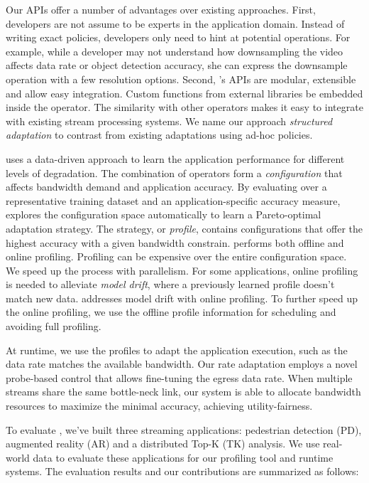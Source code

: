Our APIs offer a number of advantages over existing approaches. First,
developers are not assume to be experts in the application domain. Instead of
writing exact policies, developers only need to hint at potential
operations. For example, while a developer may not understand how downsampling
the video affects data rate or object detection accuracy, she can express the
downsample operation with a few resolution options. Second, \sysname{}'s APIs
are modular, extensible and allow easy integration. Custom functions from
external libraries be embedded inside the operator. The similarity with other
operators makes it easy to integrate with existing stream processing systems.
We name our approach \textit{structured adaptation} to contrast from existing
adaptations using ad-hoc policies.

\sysname{} uses a data-driven approach to learn the application performance for
different levels of degradation. The combination of \maybe{} operators form a
\textit{configuration} that affects bandwidth demand and application
accuracy. By evaluating over a representative training dataset and an
application-specific accuracy measure, \sysname{} explores the configuration
space automatically to learn a Pareto-optimal adaptation strategy. The strategy,
or \textit{profile}, contains configurations that offer the highest accuracy
with a given bandwidth constrain. \sysname{} performs both offline and online
profiling. Profiling can be expensive over the entire configuration space. We
speed up the process with parallelism. For some applications, online profiling
is needed to alleviate \textit{model drift}, where a previously learned profile
doesn't match new data. \sysname{} addresses model drift with online profiling.
To further speed up the online profiling, we use the offline profile information
for scheduling and avoiding full profiling.

At runtime, we use the profiles to adapt the application execution, such as the
data rate matches the available bandwidth. Our rate adaptation employs a novel
probe-based control that allows fine-tuning the egress data rate. When multiple
streams share the same bottle-neck link, our system is able to allocate
bandwidth resources to maximize the minimal accuracy, achieving
utility-fairness.

To evaluate \sysname{}, we've built three streaming applications: pedestrian
detection (PD), augmented reality (AR) and a distributed Top-K (TK) analysis. We
use real-world data to evaluate these applications for our profiling tool and
runtime systems. The evaluation results and our contributions are summarized as
follows:

